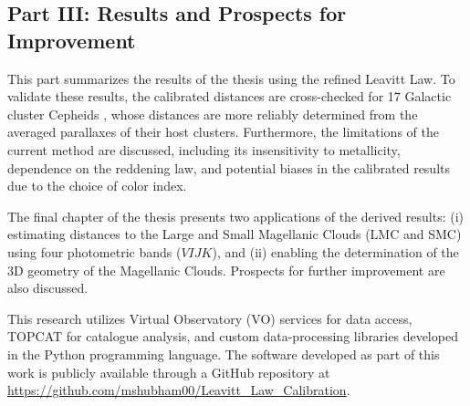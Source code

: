 \subsection{Part III: Results and Prospects for Improvement}
This part summarizes the results of the thesis using the refined Leavitt Law. To validate these results, the calibrated distances are cross-checked for 17 Galactic cluster Cepheids \citep{2023cruz}, whose distances are more reliably determined from the averaged parallaxes of their host clusters. Furthermore, the limitations of the current method are discussed, including its insensitivity to metallicity, dependence on the reddening law, and potential biases in the calibrated results due to the choice of color index.

The final chapter of the thesis presents two applications of the derived results: (i) estimating distances to the Large and Small Magellanic Clouds (LMC and SMC) using four photometric bands ($VIJK$), and (ii) enabling the determination of the 3D geometry of the Magellanic Clouds. Prospects for further improvement are also discussed.

This research utilizes Virtual Observatory (VO) services for data access, TOPCAT for catalogue analysis, and custom data-processing libraries developed in the Python programming language. The software developed as part of this work is publicly available through a GitHub repository at \url{https://github.com/mshubham00/Leavitt_Law_Calibration}.


